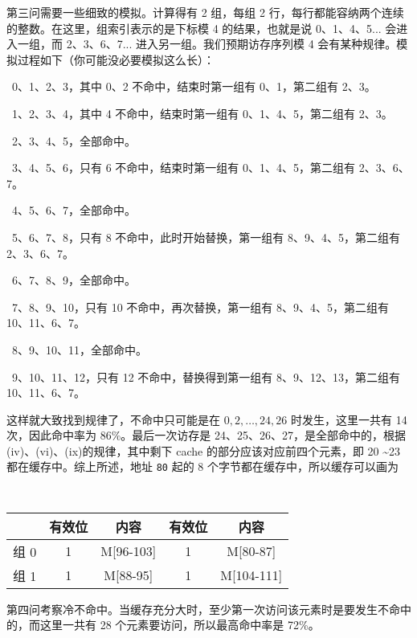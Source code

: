 \begin{problems}
        第三问需要一些细致的模拟。计算得有 2 组，每组 2 行，每行都能容纳两个连续的整数。在这里，组索引表示的是下标模 4 的结果，也就是说 0、1、4、5... 会进入一组，而 2、3、6、7... 进入另一组。我们预期访存序列模 4 会有某种规律。模拟过程如下（你可能没必要模拟这么长）：
        \begin{compactenum}[(i)]
            \item\ 0、1、2、3，其中 0、2 不命中，结束时第一组有 0、1，第二组有 2、3。
            \item\ 1、2、3、4，其中 4 不命中，结束时第一组有 0、1、4、5，第二组有 2、3。
            \item\ 2、3、4、5，全部命中。
            \item\ 3、4、5、6，只有 6 不命中，结束时第一组有 0、1、4、5，第二组有 2、3、6、7。
            \item\ 4、5、6、7，全部命中。
            \item\ 5、6、7、8，只有 8 不命中，此时开始替换，第一组有 8、9、4、5，第二组有 2、3、6、7。
            \item\ 6、7、8、9，全部命中。
            \item\ 7、8、9、10，只有 10 不命中，再次替换，第一组有 8、9、4、5，第二组有 10、11、6、7。
            \item\ 8、9、10、11，全部命中。
            \item\ 9、10、11、12，只有 12 不命中，替换得到第一组有 8、9、12、13，第二组有 10、11、6、7。
        \end{compactenum}
        这样就大致找到规律了，不命中只可能是在 $0, 2, \dotsc, 24, 26$ 时发生，这里一共有 14 次，因此命中率为 86\%。最后一次访存是 24、25、26、27，是全部命中的，根据(iv)、(vi)、(ix)的规律，其中剩下 cache 的部分应该对应前四个元素，即 20 \textasciitilde23 都在缓存中。综上所述，地址 \verb|80| 起的 8 个字节都在缓存中，所以缓存可以画为
        \begin{table}[H]
            \tt
            \centering
            \begin{tabular}{|c|c|c|c|c|}
                \hline
                & 有效位 & 内容 & 有效位 & 内容 \\ \hline
                组 0 & 1 & M[96-103] & 1 & M[80-87] \\ \hline
                组 1 & 1 & M[88-95] & 1 & M[104-111] \\ \hline
            \end{tabular}
        \end{table}

        第四问考察冷不命中。当缓存充分大时，至少第一次访问该元素时是要发生不命中的，而这里一共有 28 个元素要访问，所以最高命中率是 72\%。
    \end{problems}

